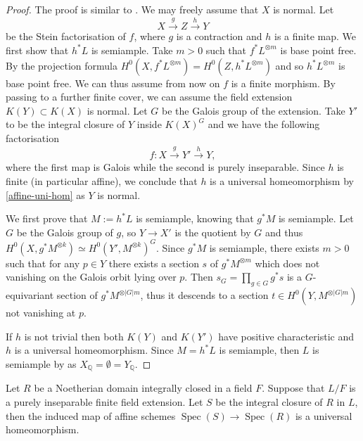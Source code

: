 \documentclass[a4paper,12pt]{book}
\DeclareMathOperator{\Spec}{Spec}
\begin{document}
	\begin{proof}
		
		The proof is similar to \cite[Lemma 2.10]{Keel}.	
		We may freely assume that $X$ is normal. 
		Let $$X \xrightarrow{g} Z \xrightarrow{h} Y$$ be the Stein factorisation of $f$, where $g$ is a contraction and $h$ is a finite map. 
		We first show that $h^*L$ is semiample. Take $m>0$ such that $f^*L^{\otimes m}$ is base point free. By the projection formula $H^0(X, f^*L^{\otimes m})=H^0(Z, h^*L^{\otimes m})$ and so $h^*L^{\otimes m}$ is base point free.
		We can thus assume from now on $f$ is a finite morphism.
		By passing to a further finite cover, we can assume the field extension $K(Y) \subset K(X)$ is normal. Let $G$ be the Galois group of the extension.
		Take $Y'$ to be the integral closure of $Y$ inside $K(X)^G$ and we have the following factorisation 
		$$f \colon X \xrightarrow{g} Y' \xrightarrow{h} Y,$$ 
		where the first map is Galois while the second is purely inseparable. Since $h$ is finite (in particular affine), we conclude that $h$ is a universal homeomorphism by \autoref{affine-uni-hom}  as $Y$ is normal. 
		
		We first prove that $M:=h^*L$ is semiample, knowing that $g^*M$ is semiample.
		Let $G$ be the Galois group of $g$, so $Y \to X'$ is the quotient by $G$ and thus $H^{0}(X,g^*M^{\otimes k})\simeq H^{0}(Y',M^{\otimes k})^{G}$. 
		Since $g^*M$ is semiample, there exists $m > 0$ such that for any $p \in Y$ there exists a section $s$ of $g^{*}M^{\otimes m}$ which does not vanishing on the Galois orbit lying over $p$. Then $s_{G}=\prod_{g \in G} g^*s $ is a $G$-equivariant section of $g^*M^{\otimes |G|m}$, thus it descends to a section $t \in H^0(Y, M^{\otimes |G|m})$ not vanishing at $p$.
		
	 	If $h$ is not trivial then both $K(Y)$ and $K(Y')$ have positive characteristic and $h$ is a universal homeomorphism. Since $M=h^{*}L$ is semiample, then $L$ is semiample by \cite[Proposition 3.5]{witaszek2020keels} as $X_{\mathbb{Q}}=\emptyset=Y_{\mathbb{Q}}$.
	\end{proof}
	
	\begin{lemma}\label{affine-uni-hom}
		
		Let $R$ be a Noetherian domain integrally closed in a field $F$. Suppose that $L/F$ is a purely inseparable finite field extension. Let $S$ be the integral closure of $R$ in $L$, then the induced map of affine schemes $\Spec(S) \to \Spec(R)$ is a universal homeomorphism.
	\end{lemma}
	
\end{document}
